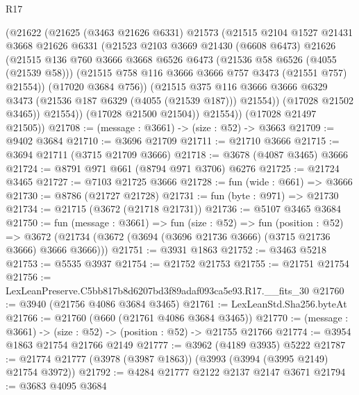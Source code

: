 \begin{lexlean}{R17}
\begin{coremodule}
              (@21622
                (@21625
                  (@3463 @21626 @6331)
                  @21573
                  (@21515
                    @2104
                    @1527
                    @21431
                    @3668
                    @21626
                    @6331
                    (@21523
                      @2103
                      @3669
                      @21430
                      (@6608 @6473)
                      @21626
                      (@21515
                        @136
                        @760
                        @3666
                        @3668
                        @6526
                        @6473
                        (@21536 @58 @6526 (@4055 (@21539 @58)))
                        (@21515 @758 @116 @3666 @3666 @757 @3473 (@21551 @757) @21554))
                      (@17020 @3684 @756))
                    (@21515
                      @375
                      @116
                      @3666
                      @3666
                      @6329
                      @3473
                      (@21536 @187 @6329 (@4055 (@21539 @187)))
                      @21554))
                  (@17028 @21502 @3465))
                @21554))
            (@17028 @21500 @21504))
          @21554))
      (@17028 @21497 @21505))
@21708 := (message : @3661) -> (size : @52) -> @3663
@21709 := @9402 @3684
@21710 := @3696 @21709
@21711 := @21710 @3666
@21715 := @3694 @21711 (@3715 @21709 @3666)
@21718 := @3678 (@4087 @3465) @3666
@21724 := @8791 @971 @661 (@8794 @971 @3706) @6276
@21725 := @21724 @3465
@21727 := @7103 @21725 @3666
@21728 := fun (wide : @661) => @3666
@21730 := @8786 (@21727 @21728)
@21731 := fun (byte : @971) => @21730
@21734 := @21715 (@3672 (@21718 @21731))
@21736 := @5107 @3465 @3684
@21750 := fun (message : @3661) =>
  fun (size : @52) =>
  fun (position : @52) =>
  @3672 (@21734 (@3672 (@3694 (@3696 @21736 @3666) (@3715 @21736 @3666) @3666 @3666)))
@21751 := @3931 @1863
@21752 := @3463 @5218
@21753 := @5535 @3937
@21754 := @21752 @21753
@21755 := @21751 @21754
@21756 := LexLeanPreserve.C5bb817b8d6207bd3f89adaf093ca5e93.R17.__fits_30
@21760 := @3940 (@21756 @4086 @3684 @3465)
@21761 := LexLeanStd.Sha256.byteAt
@21766 := @21760 (@660 (@21761 @4086 @3684 @3465))
@21770 := (message : @3661) -> (size : @52) -> (position : @52) -> @21755 @21766
@21774 := @3954 @1863 @21754 @21766 @2149
@21777 := @3962 (@4189 @3935) @5222
@21787 := @21774 @21777 (@3978 (@3987 @1863)) (@3993 (@3994 (@3995 @2149) @21754 @3972))
@21792 := @4284 @21777 @2122 @2137 @2147 @3671
@21794 := @3683 @4095 @3684

\end{coremodule}
\end{lexlean}
